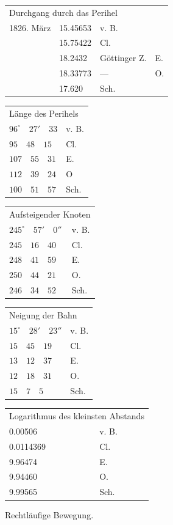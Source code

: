\begin{center}
\begingroup\small\setlength{\tabcolsep}{5pt}
\begin{tabular}{rlll}
\multicolumn{4}{l}{Durchgang durch das Perihel} \\
1826. März & 15.45653 & v. B. & \\
 & 15.75422 & Cl. & \\
 & 18.2432 & Göttinger Z. & E. \\
 & 18.33773 & --- & O. \\
 & 17.620 & Sch. & \\
\end{tabular}
\par\medskip
\begin{tabular}{ll}
\multicolumn{2}{l}{Länge des Perihels} \\
$96^{\circ}\quad27'\quad33$ & v. B. \\
$95\quad48\quad15$ & Cl. \\
$107\quad55\quad31$ & E. \\
$112\quad39\quad24$ & O \\
$100\quad51\quad57$ & Sch. \\
\end{tabular}
\par\medskip
\begin{tabular}{ll}
\multicolumn{2}{l}{Aufsteigender Knoten} \\
$245^{\circ}\quad57'\quad0''$ & v. B. \\
$245\quad16\quad40$ & Cl. \\
$248\quad41\quad59$ & E. \\
$250\quad44\quad21$ & O. \\
$246\quad34\quad52$ & Sch. \\
\end{tabular}
\par\medskip
\begin{tabular}{ll}
\multicolumn{2}{l}{Neigung der Bahn} \\
$15^{\circ}\quad28'\quad23''$ & v. B. \\
$15\quad45\quad19$ & Cl. \\
$13\quad12\quad37$ & E. \\
$12\quad18\quad31$ & O. \\
$15\quad7\quad5$ & Sch. \\
\end{tabular}
\par\medskip
\begin{tabular}{ll}
\multicolumn{2}{l}{Logarithmus des kleinsten Abstands} \\
0.00506 & v. B. \\
0.0114369 & Cl. \\
9.96474 & E. \\
9.94460 & O. \\
9.99565 & Sch. \\
\end{tabular}
\endgroup
\end{center}
\noindent Rechtläufige Bewegung.

